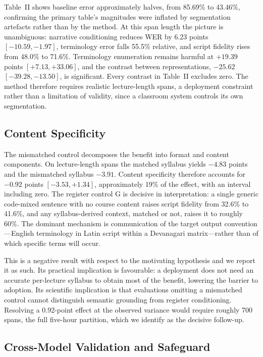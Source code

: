 \documentclass[conference]{IEEEtran}
\begin{document}
Table~II shows baseline error approximately halves, from 85.69\% to 43.46\%,
confirming the primary table's magnitudes were inflated by segmentation artefacts
rather than by the method. At this span length the picture is unambiguous:
narrative conditioning reduces WER by 6.23 points $[-10.59, -1.97]$, terminology
error falls 55.5\% relative, and script fidelity rises from 48.0\% to 71.6\%.
Terminology enumeration remains harmful at $+19.39$ points $[+7.13, +33.06]$, and
the contrast between representations, $-25.62$ $[-39.28, -13.50]$, is
significant. Every contrast in Table~II excludes zero. The method therefore
requires realistic lecture-length spans, a deployment constraint rather than a
limitation of validity, since a classroom system controls its own segmentation.

\subsection{Content Specificity}

The mismatched control decomposes the benefit into format and content components.
On lecture-length spans the matched syllabus yields $-4.83$ points and the
mismatched syllabus $-3.91$. Content specificity therefore accounts for $-0.92$
points $[-3.53, +1.34]$, approximately 19\% of the effect, with an interval
including zero. The register control G is decisive in interpretation: a single
generic code-mixed sentence with no course content raises script fidelity from
32.6\% to 41.6\%, and any syllabus-derived context, matched or not, raises it to
roughly 60\%. The dominant mechanism is communication of the target output
convention---English terminology in Latin script within a Devanagari
matrix---rather than of which specific terms will occur.

This is a negative result with respect to the motivating hypothesis and we report
it as such. Its practical implication is favourable: a deployment does not need an
accurate per-lecture syllabus to obtain most of the benefit, lowering the barrier
to adoption. Its scientific implication is that evaluations omitting a mismatched
control cannot distinguish semantic grounding from register conditioning.
Resolving a 0.92-point effect at the observed variance would require roughly 700
spans, the full five-hour partition, which we identify as the decisive follow-up.

\subsection{Cross-Model Validation and Safeguard}
\end{document}

